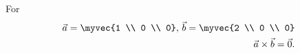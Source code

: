 For
\begin{align}
\vec{a} = \myvec{1 \\ 0 \\ 0},\, \vec{b} = \myvec{2 \\ 0 \\ 0}
\\
   \vec{a} \times \vec{b} = \vec{0}. 
\end{align}

